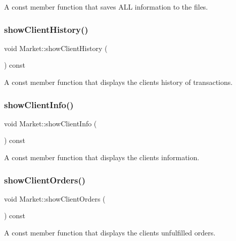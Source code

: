 A const member function that saves A\+LL information to the files. \mbox{\label{class_market_ab12d4a35aed820924483f336948cf4b4}} 
\subsubsection{\texorpdfstring{show\+Client\+History()}{showClientHistory()}}
{\footnotesize\ttfamily void Market\+::show\+Client\+History (\begin{DoxyParamCaption}{ }\end{DoxyParamCaption}) const}

A const member function that displays the client\textquotesingle{}s history of transactions. \mbox{\label{class_market_ad55d5db41984c8c4f1f027cd1f720a0b}} 
\subsubsection{\texorpdfstring{show\+Client\+Info()}{showClientInfo()}}
{\footnotesize\ttfamily void Market\+::show\+Client\+Info (\begin{DoxyParamCaption}{ }\end{DoxyParamCaption}) const}

A const member function that displays the client\textquotesingle{}s information. \mbox{\label{class_market_aa81ff10670a6d41b22573cb48c40938e}} 
\subsubsection{\texorpdfstring{show\+Client\+Orders()}{showClientOrders()}}
{\footnotesize\ttfamily void Market\+::show\+Client\+Orders (\begin{DoxyParamCaption}{ }\end{DoxyParamCaption}) const}

A const member function that displays the client\textquotesingle{}s unfulfilled orders. \mbox{\label{class_market_a6b0d677963c278fc238c1efdd29ba43e}} 
